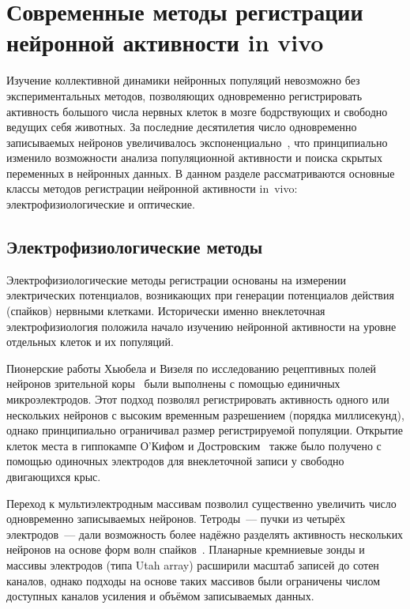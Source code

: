 \section{Современные методы регистрации нейронной активности in vivo}
\label{sec:registration_methods}

Изучение коллективной динамики нейронных популяций невозможно без экспериментальных методов, позволяющих одновременно регистрировать активность большого числа нервных клеток в мозге бодрствующих и свободно ведущих себя животных. За последние десятилетия число одновременно записываемых нейронов увеличивалось экспоненциально~\cite{Stevenson2011}, что принципиально изменило возможности анализа популяционной активности и поиска скрытых переменных в нейронных данных. В данном разделе рассматриваются основные классы методов регистрации нейронной активности in~vivo: электрофизиологические и оптические.

\subsection{Электрофизиологические методы}
\label{sec:electrophysiology}

Электрофизиологические методы регистрации основаны на измерении электрических потенциалов, возникающих при генерации потенциалов действия (спайков) нервными клетками. Исторически именно внеклеточная электрофизиология положила начало изучению нейронной активности на уровне отдельных клеток и их популяций.

Пионерские работы Хьюбела и Визеля по исследованию рецептивных полей нейронов зрительной коры~\cite{HubelWiesel1962} были выполнены с помощью единичных микроэлектродов. Этот подход позволял регистрировать активность одного или нескольких нейронов с высоким временным разрешением (порядка миллисекунд), однако принципиально ограничивал размер регистрируемой популяции. Открытие клеток места в гиппокампе О'Кифом и Достровским~\cite{o1971hippocampus} также было получено с помощью одиночных электродов для внеклеточной записи у свободно двигающихся крыс.

Переход к мультиэлектродным массивам позволил существенно увеличить число одновременно записываемых нейронов. Тетроды~--- пучки из четырёх электродов~--- дали возможность более надёжно разделять активность нескольких нейронов на основе форм волн спайков~\cite{Wilson1993}. Планарные кремниевые зонды и массивы электродов (типа Utah array) расширили масштаб записей до сотен каналов, однако подходы на основе таких массивов были ограничены числом доступных каналов усиления и объёмом записываемых данных.

